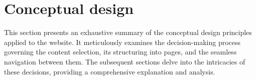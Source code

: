 \section{Conceptual design}
This section presents an exhaustive summary of the conceptual design principles applied to the website.
It meticulously examines the decision-making process governing the content selection, its structuring into pages,
and the seamless navigation between them. The subsequent sections delve into the intricacies of these decisions,
providing a comprehensive explanation and analysis.





